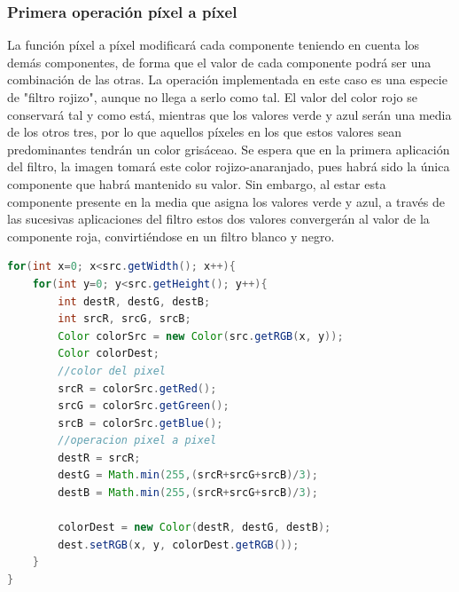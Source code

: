 \subsubsection{Primera operación píxel a píxel}
La función píxel a píxel modificará cada componente teniendo en cuenta los demás componentes, de forma que el valor de cada componente podrá ser una combinación de las otras.
\vskip0.3cm
La operación implementada en este caso es una especie de "filtro rojizo", aunque no llega a serlo como tal. El valor del color rojo se conservará tal y como está, mientras que los valores verde y azul serán una media de los otros tres, por lo que aquellos píxeles en los que estos valores sean predominantes tendrán un color grisáceao.
\vskip0.3cm
Se espera que en la primera aplicación del filtro, la imagen tomará este color rojizo-anaranjado, pues habrá sido la única componente que habrá mantenido su valor. Sin embargo, al estar esta componente presente en la media que asigna los valores verde y azul, a través de las sucesivas aplicaciones del filtro estos dos valores convergerán al valor de la componente roja, convirtiéndose en un filtro blanco y negro.
\begin{lstlisting}[language=Java, caption=Operación pixel a pixel, label=lst:graddesc]
for(int x=0; x<src.getWidth(); x++){
    for(int y=0; y<src.getHeight(); y++){
        int destR, destG, destB;
        int srcR, srcG, srcB;
        Color colorSrc = new Color(src.getRGB(x, y));
        Color colorDest;
        //color del pixel
        srcR = colorSrc.getRed();
        srcG = colorSrc.getGreen();
        srcB = colorSrc.getBlue();
        //operacion pixel a pixel
        destR = srcR;
        destG = Math.min(255,(srcR+srcG+srcB)/3);
        destB = Math.min(255,(srcR+srcG+srcB)/3);
                
        colorDest = new Color(destR, destG, destB);
        dest.setRGB(x, y, colorDest.getRGB());
    }
}
\end{lstlisting}
\vskip0.3cm
